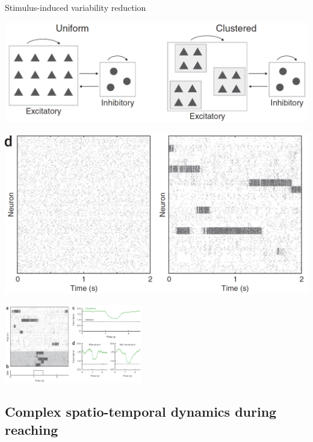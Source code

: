 \documentclass[fleqn]{beamer}
\newcommand{\ppc}[1]{\pause\setcounter{page}{#1}}
\begin{document}
\begin{frame}{Stimulus-induced variability reduction}
\begin{minipage}{.48\linewidth}
 \begin{center}
	\includegraphics[trim=7cm 0cm 0cm
0cm,clip=true,width=.8\textwidth]{figures/doiron3}
 \end{center}
 \begin{center}
	\includegraphics[trim=7.6cm 0cm 0cm
0cm,clip=true,width=.8\textwidth]{figures/doiron4}
 \end{center}
\end{minipage}\ppc{14}
\begin{minipage}{.48\linewidth}
 \begin{center}
  \includegraphics[width=6cm,keepaspectratio=true]{figures/doiron2}
  \begin{flushright}
      {\footnotesize \cite{Litwin-Kumar2012}}
  \end{flushright}
\end{center}
\end{minipage}
\end{frame}

\subsection{Complex spatio-temporal dynamics during reaching}
\end{document}
